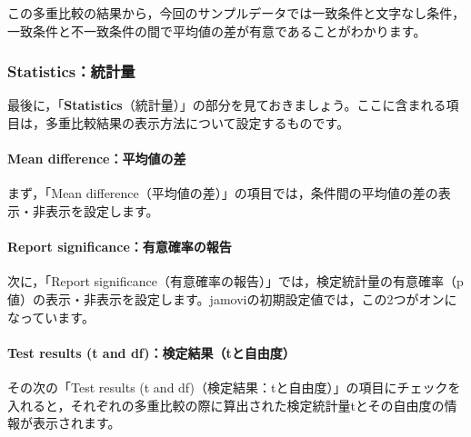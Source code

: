 \documentclass[
  12pt,
  a5jpaper,
  lualatex, ja=standard]{bxjsbook}
\begin{document}
この多重比較の結果から，今回のサンプルデータでは一致条件と文字なし条件，一致条件と不一致条件の間で平均値の差が有意であることがわかります。

\hypertarget{statisticsux7d71ux8a08ux91cf}{%
\subsubsection*{Statistics：統計量}\label{statisticsux7d71ux8a08ux91cf}}

最後に，「\textbf{Statistics}（統計量）」の部分を見ておきましょう。ここに含まれる項目は，多重比較結果の表示方法について設定するものです。

\hypertarget{mean-differenceux5e73ux5747ux5024ux306eux5dee-1}{%
\paragraph*{Mean difference：平均値の差}\label{mean-differenceux5e73ux5747ux5024ux306eux5dee-1}}

まず，「Mean difference（平均値の差）」の項目では，条件間の平均値の差の表示・非表示を設定します。

\hypertarget{report-significanceux6709ux610fux78baux7387ux306eux5831ux544a}{%
\paragraph*{Report significance：有意確率の報告}\label{report-significanceux6709ux610fux78baux7387ux306eux5831ux544a}}

次に，「Report significance（有意確率の報告）」では，検定統計量の有意確率（p値）の表示・非表示を設定します。jamoviの初期設定値では，この2つがオンになっています。

\hypertarget{test-results-t-and-dfux691cux5b9aux7d50ux679ctux3068ux81eaux7531ux5ea6}{%
\paragraph{Test results (t and df)：検定結果（tと自由度）}\label{test-results-t-and-dfux691cux5b9aux7d50ux679ctux3068ux81eaux7531ux5ea6}}

その次の「Test results (t and df)（検定結果：tと自由度）」の項目にチェックを入れると，それぞれの多重比較の際に算出された検定統計量tとその自由度の情報が表示されます。
\end{document}
